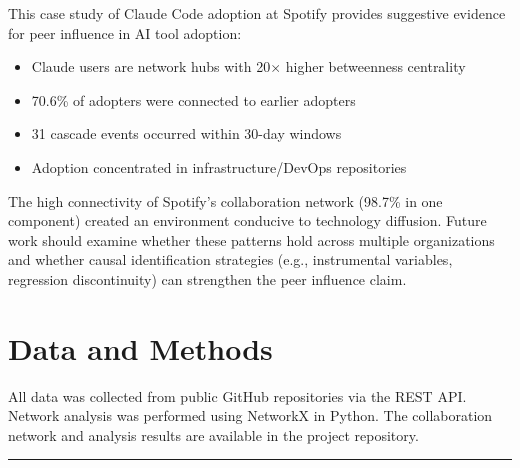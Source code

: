 \documentclass[11pt]{article}
\begin{document}
This case study of Claude Code adoption at Spotify provides suggestive evidence for peer influence in AI tool adoption:

\begin{itemize}
    \item Claude users are network hubs with 20$\times$ higher betweenness centrality
    \item 70.6\% of adopters were connected to earlier adopters
    \item 31 cascade events occurred within 30-day windows
    \item Adoption concentrated in infrastructure/DevOps repositories
\end{itemize}

The high connectivity of Spotify's collaboration network (98.7\% in one component) created an environment conducive to technology diffusion. Future work should examine whether these patterns hold across multiple organizations and whether causal identification strategies (e.g., instrumental variables, regression discontinuity) can strengthen the peer influence claim.

\section*{Data and Methods}

All data was collected from public GitHub repositories via the REST API. Network analysis was performed using NetworkX in Python. The collaboration network and analysis results are available in the project repository.

\vspace{1em}
\hrule
\vspace{0.5em}
\small
\end{document}
